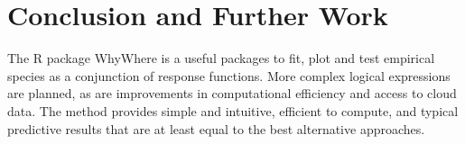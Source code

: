 \documentclass{article}
\newcommand{\pkg}[1]{{\fontseries{b}\selectfont #1}}
\begin{document}
\section{Conclusion and Further Work}

The R package \pkg{WhyWhere} is a useful packages to fit, plot and test empirical species as a conjunction of response functions.  More complex logical expressions are planned, as are improvements in computational efficiency and access to cloud data.  The method provides simple and intuitive, efficient to compute, and typical predictive results that are at least equal to the best alternative approaches.  




\end{document}

